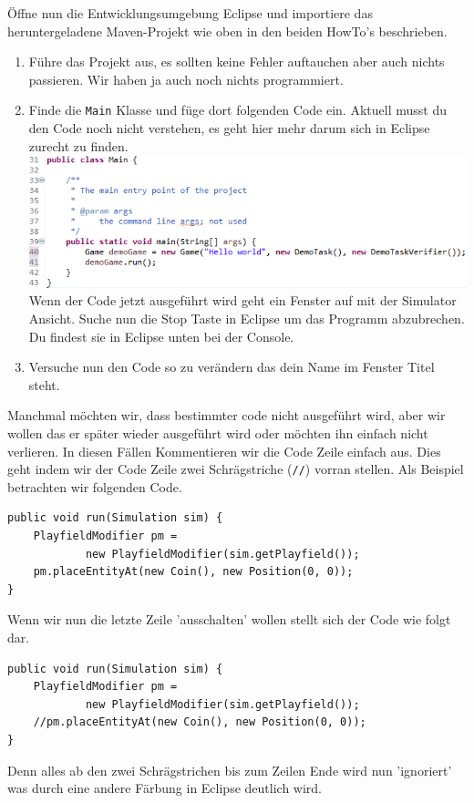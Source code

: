 \newpage

Öffne nun die Entwicklungsumgebung Eclipse und importiere das heruntergeladene Maven-Projekt \jvkpackage wie oben in den beiden HowTo's beschrieben.

\begin{enumerate}[label=\alph*)]
    \item Führe das Projekt aus, es sollten keine Fehler auftauchen aber auch nichts passieren.
    Wir haben ja auch noch nichts programmiert.
    \item Finde die \texttt{Main} Klasse und füge dort folgenden Code ein.
    Aktuell musst du den Code noch nicht verstehen, es geht hier mehr darum sich in Eclipse zurecht zu finden.\\
    \includegraphics[width=\linewidth]{./figures/code.1.png}\\
    Wenn der Code jetzt ausgeführt wird geht ein Fenster auf mit der Simulator Ansicht.
    Suche nun die Stop Taste in Eclipse um das Programm abzubrechen.
    Du findest sie in Eclipse unten bei der Console.
    \item Versuche nun den Code so zu verändern das dein Name im Fenster Titel steht.
\end{enumerate}

\begin{Infobox}
    Manchmal möchten wir, dass bestimmter code nicht ausgeführt wird, aber wir wollen das er später wieder ausgeführt wird oder möchten ihn einfach nicht verlieren.
    In diesen Fällen Kommentieren wir die Code Zeile einfach aus.
    Dies geht indem wir der Code Zeile zwei Schrägstriche ({\color{javagreen}\texttt{//}}) vorran stellen.
    Als Beispiel betrachten wir folgenden Code.

    \begin{lstlisting}
public void run(Simulation sim) {
    PlayfieldModifier pm =
            new PlayfieldModifier(sim.getPlayfield());
    pm.placeEntityAt(new Coin(), new Position(0, 0));
}
    \end{lstlisting}

    Wenn wir nun die letzte Zeile 'ausschalten' wollen stellt sich der Code wie folgt dar.

    \begin{lstlisting}
public void run(Simulation sim) {
    PlayfieldModifier pm =
            new PlayfieldModifier(sim.getPlayfield());
    //pm.placeEntityAt(new Coin(), new Position(0, 0));
}
    \end{lstlisting}

    Denn alles ab den zwei Schrägstrichen bis zum Zeilen Ende wird nun 'ignoriert' was durch eine andere Färbung in Eclipse deutlich wird.
\end{Infobox}

